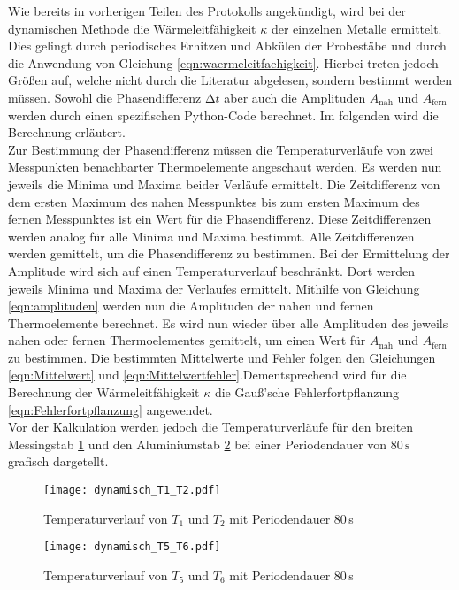 Wie bereits in vorherigen Teilen des Protokolls angekündigt, wird bei der dynamischen Methode die Wärmeleitfähigkeit $\kappa$ der einzelnen Metalle
ermittelt. Dies gelingt durch periodisches Erhitzen und Abkülen der Probestäbe und durch die Anwendung von Gleichung \eqref{eqn:waermeleitfaehigkeit}.
Hierbei treten jedoch Größen auf, welche nicht durch die Literatur abgelesen, sondern bestimmt werden müssen. 
Sowohl die Phasendifferenz $\increment t$ aber auch die Amplituden $A_{\text{nah}}$ und $A_{\text{fern}}$ werden durch einen spezifischen Python-Code 
berechnet. Im folgenden wird die Berechnung erläutert. \\
Zur Bestimmung der Phasendifferenz müssen die Temperaturverläufe von zwei Messpunkten benachbarter Thermoelemente angeschaut werden. Es werden nun 
jeweils die Minima und Maxima beider Verläufe ermittelt. Die Zeitdifferenz von dem ersten Maximum des nahen Messpunktes bis zum ersten Maximum des fernen 
Messpunktes ist ein Wert für die Phasendifferenz. Diese Zeitdifferenzen werden analog für alle Minima und Maxima bestimmt. Alle Zeitdifferenzen werden 
gemittelt, um die Phasendifferenz zu bestimmen.
Bei der Ermittelung der Amplitude wird sich auf einen Temperaturverlauf beschränkt. Dort werden jeweils Minima und Maxima der Verlaufes ermittelt.
Mithilfe von Gleichung \eqref{eqn:amplituden} werden nun die Amplituden der nahen und fernen Thermoelemente berechnet. Es wird nun wieder 
über alle Amplituden des jeweils nahen oder fernen Thermoelementes gemittelt, um einen Wert für $A_{\text{nah}}$ und $A_{\text{fern}}$ zu bestimmen.
Die bestimmten Mittelwerte und Fehler folgen den Gleichungen \eqref{eqn:Mittelwert} und \eqref{eqn:Mittelwertfehler}.Dementsprechend wird 
für die Berechnung der Wärmeleitfähigkeit $\kappa$ die Gauß'sche Fehlerfortpflanzung \eqref{eqn:Fehlerfortpflanzung} angewendet.\\
Vor der Kalkulation werden jedoch die Temperaturverläufe für den breiten Messingstab \ref{fig:dynamisch1} und den 
Aluminiumstab \ref{fig:dynamisch2} bei einer Periodendauer von 80\,$\unit{\second}$ grafisch dargetellt.

\begin{figure}[H]
  \centering
  \texttt{[image: dynamisch\_T1\_T2.pdf]}
  \caption{Temperaturverlauf von $T_1$ und $T_2$ mit Periodendauer 80\,\unit{\second}}
  \label{fig:dynamisch1}
\end{figure}

\begin{figure}[H]
  \centering
  \texttt{[image: dynamisch\_T5\_T6.pdf]}
  \caption{Temperaturverlauf von $T_5$ und $T_6$ mit Periodendauer 80\,\unit{\second}}
  \label{fig:dynamisch2}
\end{figure}

